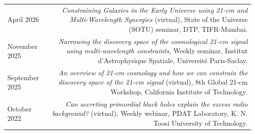 \documentclass{article}
\begin{document}
\begin{longtable}{L!{\vrule}R}

    April 2026 & \textit{Constraining Galaxies in the Early Universe using 21-cm and Multi-Wavelength Synergies} (virtual), State of the Universe (SOTU) seminar, DTP, TIFR-Mumbai. \\

    November 2025 & \textit{Narrowing the discovery space of the cosmological 21-cm signal using multi-wavelength constraints}, Weekly seminar, Institut d'Astrophysique Spatiale, Université Paris-Saclay. \\

    September 2025 & \textit{An overview of 21-cm cosmology and how we can constrain the discovery space of the 21-cm signal} (virtual), 8th Global 21-cm Workshop, California Institute of Technology. \\

    October 2022 & \textit{Can accreting primordial black holes explain the excess radio background?} (virtual), Weekly webinar, PDAT Laboratory, K. N. Toosi University of Technology. \\
    
\end{longtable}
\end{document}
